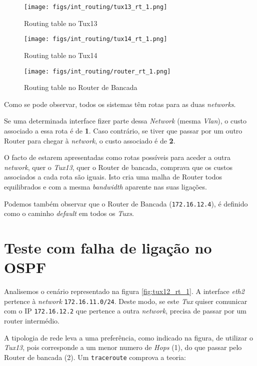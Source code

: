 \begin{figure}[H]
    \centering
    \texttt{[image: figs/int\_routing/tux13\_rt\_1.png]}
    \caption{Routing table no Tux13}
    \label{fig:tux13_rt_1}
\end{figure}

\begin{figure}[H]
    \centering
    \texttt{[image: figs/int\_routing/tux14\_rt\_1.png]}
    \caption{Routing table no Tux14}
    \label{fig:tux14_rt_1}
\end{figure}

\begin{figure}[H]
    \centering
    \texttt{[image: figs/int\_routing/router\_rt\_1.png]}
    \caption{Routing table no Router de Bancada}
    \label{fig:router_rt_1}
\end{figure}

Como se pode observar, todos os sistemas têm rotas para as duas \textit{networks}.

Se uma determinada interface fizer parte dessa \textit{Network} (mesma \textit{Vlan}), o custo associado a essa rota é de \textbf{1}.
Caso contrário, se tiver que passar por um outro Router para chegar à \textit{network}, o custo associado é de \textbf{2}.

O facto de estarem apresentadas como rotas possíveis para aceder a outra \textit{network}, quer o \textit{Tux13}, quer o Router de bancada, comprava que os custos associados a cada rota são iguais.
Isto cria uma malha de Router todos equilibrados e com a mesma \textit{bandwidth} aparente nas suas ligações.

Podemos também observar que o Router de Bancada (\verb|172.16.12.4|), é definido como o caminho \textit{default} em todos os \textit{Tuxs}.

\section{Teste com falha de ligação no OSPF}

Analisemos o cenário representado na figura \ref{fig:tux12_rt_1}.
A interface \textit{eth2} pertence à \textit{network} \verb|172.16.11.0/24|.
Deste modo, se este \textit{Tux} quiser comunicar com o IP \verb|172.16.12.2| que pertence a outra \textit{network}, precisa de passar por um router intermédio.

A tipologia de rede leva a uma preferência, como indicado na figura, de utilizar o \textit{Tux13}, pois corresponde a um menor numero de \textit{Hops} (1), do que passar pelo Router de bancada (2).
Um \verb|traceroute| comprova a teoria:

